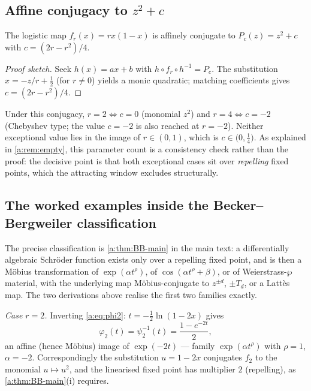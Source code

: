 \subsection{Affine conjugacy to $z^2+c$}

\begin{lemma}
\label{a:lem:affine}
The logistic map $f_r(x)=rx(1-x)$ is affinely conjugate to $P_c(z)=z^2+c$ with $c=(2r-r^2)/4$.
\end{lemma}

\begin{proof}[Proof sketch]
Seek $h(x)=ax+b$ with $h\circ f_r\circ h^{-1}=P_c$. The substitution $x=-z/r+\tfrac12$ (for $r\neq0$) yields a monic quadratic; matching coefficients gives $c=(2r-r^2)/4$.
\end{proof}

Under this conjugacy, $r=2\Leftrightarrow c=0$ (monomial $z^2$) and $r=4\Leftrightarrow c=-2$ (Chebyshev type; the value $c=-2$ is also reached at $r=-2$). Neither exceptional value lies in the image of $r\in(0,1)$, which is $c\in\bigl(0,\tfrac14\bigr)$. As explained in \cref{a:rem:empty}, this parameter count is a consistency check rather than the proof: the decisive point is that both exceptional cases sit over \emph{repelling} fixed points, which the attracting window excludes structurally.

\subsection{The worked examples inside the Becker--Bergweiler classification}

The precise classification is \cref{a:thm:BB-main} in the main text: a differentially algebraic Schr\"oder function exists only over a repelling fixed point, and is then a M\"obius transformation of $\exp(\alpha t^{\rho})$, of $\cos(\alpha t^{\rho}+\beta)$, or of Weierstrass-$\wp$ material, with the underlying map M\"obius-conjugate to $z^{\pm d}$, $\pm T_d$, or a Latt\`es map. The two derivations above realise the first two families exactly.

\emph{Case $r=2$.} Inverting \eqref{a:eq:phi2}: $t=-\tfrac12\ln(1-2x)$ gives
\[
\varphi_2(t)=\psi_2^{-1}(t)=\frac{1-e^{-2t}}{2},
\]
an affine (hence M\"obius) image of $\exp(-2t)$ --- family $\exp(\alpha t^{\rho})$ with $\rho=1$, $\alpha=-2$. Correspondingly the substitution $u=1-2x$ conjugates $f_2$ to the monomial $u\mapsto u^2$, and the linearised fixed point has multiplier $2$ (repelling), as \cref{a:thm:BB-main}(i) requires.

